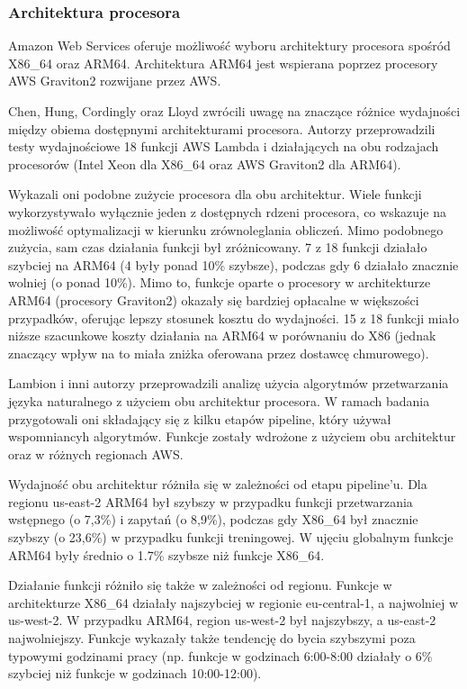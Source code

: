 \subsubsection*{Architektura procesora}

Amazon Web Services oferuje możliwość wyboru architektury procesora spośród X86\_64 oraz ARM64. Architektura ARM64 jest wspierana poprzez procesory AWS Graviton2 rozwijane przez AWS.

Chen, Hung, Cordingly oraz Lloyd \cite{10.1145/3631295.3631394} zwrócili uwagę na znaczące różnice wydajności między obiema dostępnymi architekturami procesora. Autorzy przeprowadzili testy wydajnościowe 18 funkcji AWS Lambda i działających na obu rodzajach procesorów (Intel Xeon dla X86\_64 oraz AWS Graviton2 dla ARM64). 

Wykazali oni podobne zużycie procesora dla obu architektur. Wiele funkcji wykorzystywało wyłącznie jeden z dostępnych rdzeni procesora, co wskazuje na możliwość optymalizacji w kierunku zrównoleglania obliczeń. 
Mimo podobnego zużycia, sam czas działania funkcji był zróżnicowany. 
7 z 18 funkcji działało szybciej na ARM64 (4 były ponad 10\% szybsze), podczas gdy 6 działało znacznie wolniej (o ponad 10\%).
Mimo to, funkcje oparte o procesory w architekturze ARM64 (procesory Graviton2) okazały się bardziej opłacalne w większości przypadków, oferując lepszy stosunek kosztu do wydajności.
15 z 18 funkcji miało niższe szacunkowe koszty działania na ARM64 w porównaniu do X86 (jednak znaczący wpływ na to miała zniżka oferowana przez dostawcę chmurowego).

Lambion i inni autorzy \cite{10.1145/3491204.3543506} przeprowadzili analizę użycia algorytmów przetwarzania języka naturalnego z użyciem obu architektur procesora. W ramach badania przygotowali oni składający się z kilku etapów pipeline, który używał wspomniancyh algorytmów. Funkcje zostały wdrożone z użyciem obu architektur oraz w różnych regionach AWS.

Wydajność obu architektur różniła się w zależności od etapu pipeline’u. Dla regionu us-east-2 ARM64 był szybszy w przypadku funkcji przetwarzania wstępnego (o 7,3\%) i zapytań (o 8,9\%), podczas gdy X86\_64 był znacznie szybszy (o 23,6\%) w przypadku funkcji treningowej. W ujęciu globalnym funkcje ARM64 były średnio o 1.7\% szybsze niż funkcje X86\_64.

Działanie funkcji różniło się także w zależności od regionu. Funkcje w architekturze X86\_64 działały najszybciej w regionie eu-central-1, a najwolniej w us-west-2. W przypadku ARM64, region us-west-2 był najszybszy, a us-east-2 najwolniejszy. Funkcje wykazały także tendencję do bycia szybszymi poza typowymi godzinami pracy (np. funkcje w godzinach 6:00-8:00 działały o 6\% szybciej niż funkcje w godzinach 10:00-12:00).

